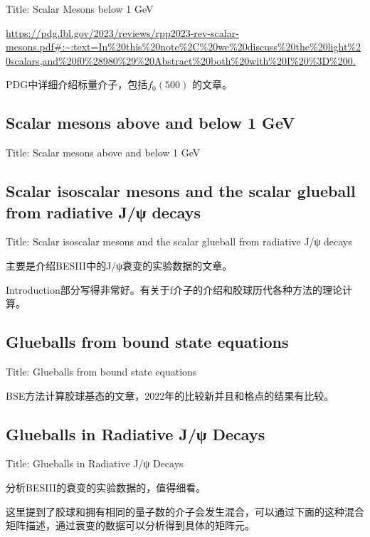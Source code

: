 \documentclass{article}
\begin{document}
Title:  Scalar Mesons below 1 GeV


\url{https://pdg.lbl.gov/2023/reviews/rpp2023-rev-scalar-mesons.pdf#:~:text=In%20this%20note%2C%20we%20discuss%20the%20light%20scalars,and%20f0%28980%29%20Abstract%20both%20with%20I%20%3D%200.}

PDG中详细介绍标量介子，包括$f_0(500)$ 的文章。



\subsection{Scalar mesons above and below 1 GeV}

Title: Scalar mesons above and below 1 GeV \cite{Close_2002}



\subsection{Scalar isoscalar mesons and the scalar glueball from radiative J/ψ decays}

Title: \quad Scalar isoscalar mesons and the scalar glueball from radiative J/ψ decays \cite{Sarantsev_2021}

主要是介绍BESIII中的J/ψ衰变的实验数据的文章。

Introduction部分写得非常好。有关于f介子的介绍和胶球历代各种方法的理论计算。





\subsection{Glueballs from bound state equations}

Title: \quad Glueballs from bound state equations \cite{2022_Huber}

BSE方法计算胶球基态的文章，2022年的比较新并且和格点的结果有比较。



\subsection{Glueballs in Radiative J/ψ Decays}

Title: \quad  Glueballs in Radiative J/ψ Decays \cite{Klempt_2022}

分析BESIII的衰变的实验数据的，值得细看。


这里提到了胶球和拥有相同的量子数的介子会发生混合，可以通过下面的这种混合矩阵描述，通过衰变的数据可以分析得到具体的矩阵元。
\end{document}
